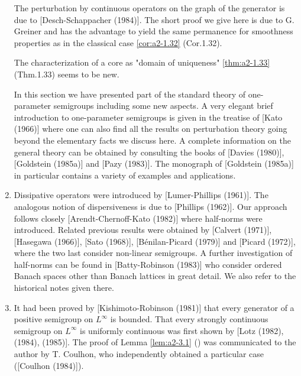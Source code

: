\begin{enumerate}[label=\emph{Section \arabic*:}, wide, labelindent=0.0em]
The perturbation by continuous operators on the graph of the generator is due to [Desch-Schappacher (1984)].
The short proof we give here is due to G. Greiner and has the advantage to yield the same permanence for smoothness properties as in the classical case \ref{cor:a2-1.32} (\lnm Cor.1.32).

The characterization of a core as "domain of uniqueness" \ref{thm:a2-1.33} (\lnm Thm.1.33) seems to be new.

In this section we have presented part of the standard theory of one-parameter semigroups including some new aspects.
A very elegant brief introduction to one-parameter semigroups is given in the treatise of [Kato (1966)] where one can also find all the results on perturbation theory going beyond the elementary facts we discuss here.
A complete information on the general theory can be obtained by consulting the books of [Davies (1980)], [Goldstein (1985a)] and [Pazy (1983)].
The monograph of [Goldstein (1985a)] in particular contains a variety of examples and applications.

\item
Dissipative operators were introduced by [Lumer-Phillips (1961)].
The analogous notion of dispersiveness is due to [Phillips (1962)].
Our approach follows closely [Arendt-Chernoff-Kato (1982)] where half-norms were introduced.
Related previous results were obtained by [Calvert (1971)], [Hasegawa (1966)], [Sato (1968)], [Bénilan-Picard (1979)] and [Picard (1972)], where the two last consider non-linear semigroups.
A further investigation of half-norms can be found in [Batty-Robinson (1983)] who consider ordered Banach spaces other than Banach lattices in great detail.
We also refer to the historical notes given there.

\item
It had been proved by [Kishimoto-Robinson (1981)] that every generator of a positive semigroup on $L^{\infty}$ is bounded.
That every strongly continuous semigroup on $L^{\infty}$ is uniformly continuous was first shown by [Lotz (1982), (1984), (1985)].
The proof of Lemma \ref{lem:a2-3.1} () was communicated to the author by T. Coulhon, who independently obtained a particular case ([Coulhon (1984)]).

\end{enumerate}
